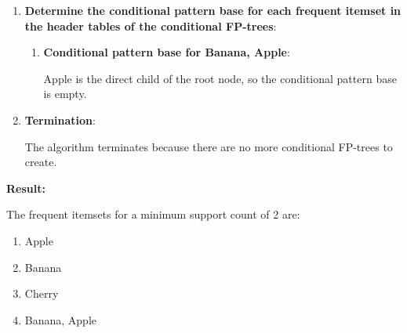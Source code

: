 \documentclass[
english,
smallborders
]{i6prcsht}
\begin{document}
\begin{solution}
\begin{enumerate}
		\item \textbf{Determine the conditional pattern base for each frequent itemset in the header tables of the conditional FP-trees}:
		      
		      
		      \begin{enumerate}
			      \item \textbf{Conditional pattern base for \glqq Banana, Apple\grqq }:
			            
			            Apple is the direct child of the root node, so the conditional pattern base is empty.
		      \end{enumerate}
		      
		      
		\item \textbf{Termination}:
		      
		      The algorithm terminates because there are no more conditional FP-trees to create.
		      
	\end{enumerate}
	
	\textbf{Result:}
	
	\vspace*{-0.2cm}
	
	The frequent itemsets for a minimum support count of 2 are:
	
	\begin{multicols}{4}
		\begin{enumerate}
			\item Apple
			\item Banana
			\item Cherry
			\item Banana, Apple
		\end{enumerate}
	\end{multicols}
	
\end{solution}
\end{document}
